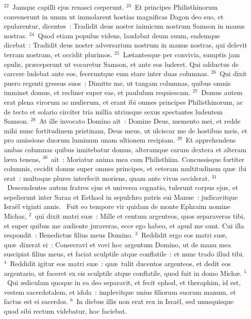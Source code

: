 ${}^{22}$~Jamque capilli ejus renasci cœperunt.
${}^{23}$~Et principes Philisthinorum convenerunt in unum ut immolarent hostias magnificas Dagon deo suo, et epularentur, dicentes~: Tradidit deus noster inimicum nostrum Samson in manus nostras.
${}^{24}$~Quod etiam populus videns, laudabat deum suum, eademque dicebat~: Tradidit deus noster adversarium nostrum in manus nostras, qui delevit terram nostram, et occidit plurimos.
${}^{25}$~L\ae tantesque per convivia, sumptis jam epulis, pr\ae ceperunt ut vocaretur Samson, et ante eos luderet. Qui adductus de carcere ludebat ante eos, feceruntque eum stare inter duas columnas.
${}^{26}$~Qui dixit puero regenti gressus suos~: Dimitte me, ut tangam columnas, quibus omnis imminet domus, et recliner super eas, et paululum requiescam.
${}^{27}$~Domus autem erat plena virorum ac mulierum, et erant ibi omnes principes Philisthinorum, ac de tecto et solario circiter tria millia utriusque sexus spectantes ludentem Samson.
${}^{28}$~At ille invocato Domino ait~: Domine Deus, memento mei, et redde mihi nunc fortitudinem pristinam, Deus meus, ut ulciscar me de hostibus meis, et pro amissione duorum luminum unam ultionem recipiam.
${}^{29}$~Et apprehendens ambas columnas quibus innitebatur domus, alteramque earum dextera et alteram l\ae va tenens,
${}^{30}$~ait~: Moriatur anima mea cum Philisthiim. Concussisque fortiter columnis, cecidit domus super omnes principes, et ceteram multitudinem qu\ae\ ibi erat~: multoque plures interfecit moriens, quam ante vivus occiderat.
${}^{31}$~Descendentes autem fratres ejus et universa cognatio, tulerunt corpus ejus, et sepelierunt inter Saraa et Esthaol in sepulchro patris sui Manue~: judicavitque Isra\"el viginti annis.
~Fuit eo tempore vir quidam de monte Ephraim nomine Michas,
${}^{2}$~qui dixit matri su\ae~: Mille et centum argenteos, quos separaveras tibi, et super quibus me audiente juraveras, ecce ego habeo, et apud me sunt. Cui illa respondit~: Benedictus filius meus Domino.
${}^{3}$~Reddidit ergo eos matri su\ae , qu\ae\ dixerat ei~: Consecravi et vovi hoc argentum Domino, ut de manu mea suscipiat filius meus, et faciat sculptile atque conflatile~: et nunc trado illud tibi.
${}^{4}$~Reddidit igitur eos matri su\ae~: qu\ae\ tulit ducentos argenteos, et dedit eos argentario, ut faceret ex eis sculptile atque conflatile, quod fuit in domo Mich\ae .
${}^{5}$~Qui \ae diculam quoque in ea deo separavit, et fecit ephod, et theraphim, id est, vestem sacerdotalem, et idola~: implevitque unius filiorum suorum manum, et factus est ei sacerdos.
${}^{6}$~In diebus illis non erat rex in Isra\"el, sed unusquisque quod sibi rectum videbatur, hoc faciebat.


